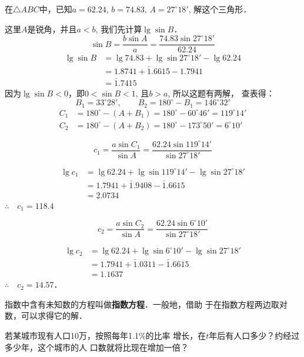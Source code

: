\begin{example}
    在$\triangle ABC$中，已知$a=62.24$, $b=74.83$, $A=
27^{\circ}18'$, 解这个三角形．
\end{example}

\begin{solution}
    这里$A$是锐角，并且$a<b$, 我们先计算$\lg\sin B$．
\[\sin B=\frac{b\sin A}{a}=\frac{74.83\sin 27^{\circ}18'}{62.24}\]
\[\begin{split}
    \lg\sin B&=\lg 74.83+\lg \sin 27^{\circ}18'-\lg 62.24\\
&=1.8741+\bar{1}.6615-1.7941\\
&=\bar{1}.7415
\end{split}\] 
因为$\lg\sin B<0$，即$0<\sin B<1$, 且$b>a$, 所以这题有两解，
查表得：
\[B_1=33^{\circ}28',\qquad B_2=180^{\circ}-B_1=146^{\circ}32'\]
\[\begin{split}
    C_1&=180^{\circ}-(A+B_1)=180^{\circ}-60^{\circ}46' =119^{\circ}14' \\
    C_2&=180^{\circ}-(A+B_2)=180^{\circ}-173^{\circ}50'=6^{\circ}10'
\end{split}\]

\[c_1=\frac{a\sin C_1}{\sin A}=\frac{62.24\sin 119^{\circ}14'}{\sin 27^{\circ}18'}\]

\[\begin{split}
    \lg c_1&= \lg 62.24+\lg \sin 119^{\circ}14'-\lg \sin 27^{\circ}18'\\
    &=1.7941+\bar{1}.9408-\bar{1}.6615\\
    &=2.0734
\end{split}\]
$\therefore\quad c_1=118.4$

\[c_2=\frac{a\sin C_2}{\sin A}=\frac{62.24\sin 6^{\circ}10'}{\sin 27^{\circ}18'}\]

\[\begin{split}
    \lg c_2&= \lg 62.24+\lg \sin 6^{\circ}10'-\lg \sin 27^{\circ}18'\\
    &=1.7941+\bar{1}.0311-\bar{1}.6615\\
    &=1.1637
\end{split}\]
$\therefore\quad c_2=14.57$．
\end{solution}  

指数中含有未知数的方程叫做\textbf{指数方程}．一般地，借助
于在指数方程两边取对数，可以求得它的解．

\begin{example}
    若某城市现有人口10万，按照每年1.1\%的比率
    增长，在$t$年后有人口多少？约经过多少年，这个城市的人
    口数就将比现在增加一倍？
\end{example}

